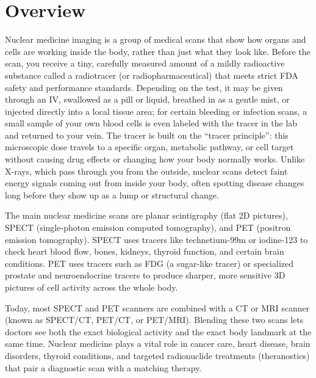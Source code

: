 \label{ch:infographic-nuclear-imaging-overview}

\section{Overview}

Nuclear medicine imaging is a group of medical scans that show how organs and cells are working inside the body, rather than just what they look like. Before the scan, you receive a tiny, carefully measured amount of a mildly radioactive substance called a radiotracer (or radiopharmaceutical) that meets strict FDA safety and performance standards. Depending on the test, it may be given through an IV, swallowed as a pill or liquid, breathed in as a gentle mist, or injected directly into a local tissue area; for certain bleeding or infection scans, a small sample of your own blood cells is even labeled with the tracer in the lab and returned to your vein. The tracer is built on the ``tracer principle'': this microscopic dose travels to a specific organ, metabolic pathway, or cell target without causing drug effects or changing how your body normally works. Unlike X-rays, which pass through you from the outside, nuclear scans detect faint energy signals coming out from inside your body, often spotting disease changes long before they show up as a lump or structural change.

The main nuclear medicine scans are planar scintigraphy (flat 2D pictures), SPECT (single-photon emission computed tomography), and PET (positron emission tomography). SPECT uses tracers like technetium-99m or iodine-123 to check heart blood flow, bones, kidneys, thyroid function, and certain brain conditions. PET uses tracers such as FDG (a sugar-like tracer) or specialized prostate and neuroendocrine tracers to produce sharper, more sensitive 3D pictures of cell activity across the whole body.

Today, most SPECT and PET scanners are combined with a CT or MRI scanner (known as SPECT/CT, PET/CT, or PET/MRI). Blending these two scans lets doctors see both the exact biological activity and the exact body landmark at the same time. Nuclear medicine plays a vital role in cancer care, heart disease, brain disorders, thyroid conditions, and targeted radionuclide treatments (theranostics) that pair a diagnostic scan with a matching therapy.

